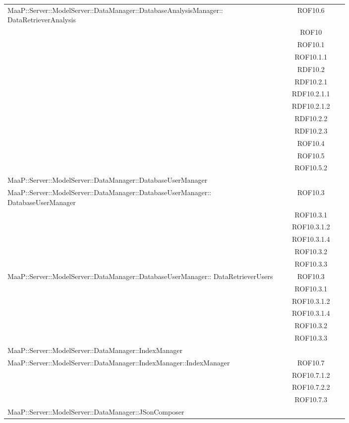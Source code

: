 \begin{center}
\begin{longtable}{|p{0.8\linewidth}|c|}
\midrule
MaaP::Server::ModelServer::DataManager::DatabaseAnalysisManager:: DataRetrieverAnalysis
& ROF10.6\\
& ROF10\\
& ROF10.1\\
& ROF10.1.1\\
& RDF10.2\\
& RDF10.2.1\\
& RDF10.2.1.1\\
& RDF10.2.1.2\\
& RDF10.2.2\\
& RDF10.2.3\\
& ROF10.4\\
& ROF10.5\\
& ROF10.5.2\\

\midrule
MaaP::Server::ModelServer::DataManager::DatabaseUserManager
& \\

\midrule
MaaP::Server::ModelServer::DataManager::DatabaseUserManager:: DatabaseUserManager
& ROF10.3\\
& ROF10.3.1\\
& ROF10.3.1.2\\
& ROF10.3.1.4\\
& ROF10.3.2\\
& ROF10.3.3\\


\midrule
MaaP::Server::ModelServer::DataManager::DatabaseUserManager:: DataRetrieverUsers
& ROF10.3\\
& ROF10.3.1\\
& ROF10.3.1.2\\
& ROF10.3.1.4\\
& ROF10.3.2\\
& ROF10.3.3\\


\midrule
MaaP::Server::ModelServer::DataManager::IndexManager
& \\

\midrule
MaaP::Server::ModelServer::DataManager::IndexManager::IndexManager
& ROF10.7\\
& ROF10.7.1.2\\
& ROF10.7.2.2\\
& ROF10.7.3\\

\midrule
MaaP::Server::ModelServer::DataManager::JSonComposer
& \\


\end{longtable}
\end{center}
